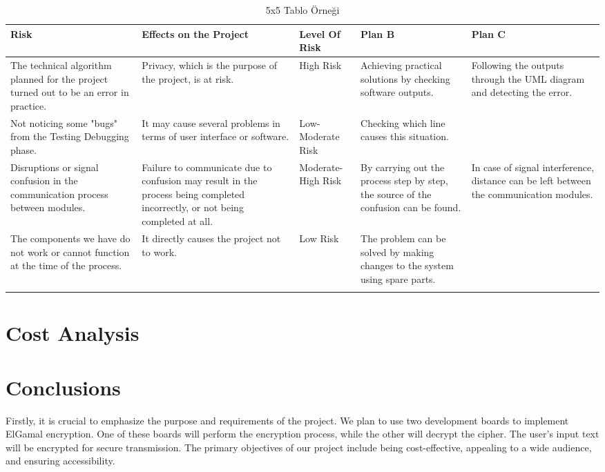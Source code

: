 \documentclass[12pt]{article}
\begin{document}
 
 	

 		\begin{longtable}{|p{3cm}|p{3cm}|p{1.6cm}|p{2cm}|p{2cm}|}
 			\hline
 			Risk  & Effects on the Project  & Level Of Risk  & Plan B & Plan C  \\
 			\hline
 		\endfirsthead
 	
 			The technical algorithm planned for the project turned out to be an error in practice.  & Privacy, which is the purpose of the project, is at risk.  & High Risk  & Achieving practical solutions by checking software outputs. & Following the outputs through the UML diagram and detecting the error.  \\	\hline
 			Not noticing some "bugs" from the Testing Debugging phase.  & It may cause several problems in terms of user interface or software.  & Low-Moderate Risk  & Checking which line causes this situation. &   \\	\hline
 			Disruptions or signal confusion in the communication process between modules.  & Failure to communicate due to confusion may result in the process being completed incorrectly, or not being completed at all.  & Moderate-High Risk& By carrying out the process step by step, the source of the confusion can be found.  & In case of signal interference, distance can be left between the communication modules.  \\	\hline
 			The components we have do not work or cannot function at the time of the process. & It directly causes the project not to work.  & Low Risk  & The problem can be solved by making changes to the system using spare parts.  &   \\
 			\hline
 			\caption{5x5 Tablo Örneği}
 	
 		\end{longtable}
 	
 		
 
 	\newpage
 	\section{Cost Analysis}
 	\newpage
 		\section{Conclusions}
	
	Firstly, it is crucial to emphasize the purpose and requirements of the project. We plan to use two development boards to implement ElGamal encryption. One of these boards will perform the encryption process, while the other will decrypt the cipher. The user's input text will be encrypted for secure transmission. The primary objectives of our project include being cost-effective, appealing to a wide audience, and ensuring accessibility.\cite{koblitz2012course}
\end{document}
